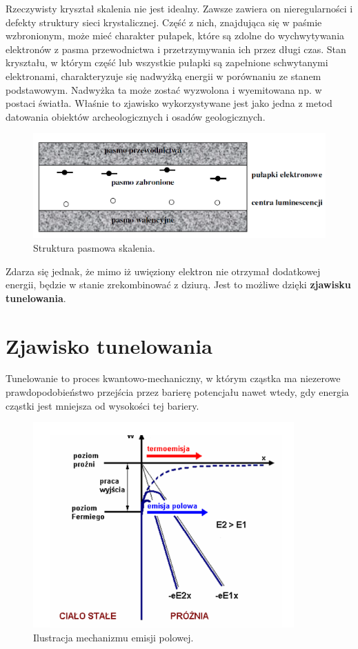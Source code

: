 Rzeczywisty kryształ skalenia nie jest idealny. Zawsze zawiera on nieregularności i defekty struktury sieci krystalicznej. Część z nich, znajdująca się w paśmie wzbronionym, może mieć charakter pułapek, które są zdolne do wychwytywania
elektronów z pasma przewodnictwa i przetrzymywania ich przez długi czas. Stan kryształu, w którym część lub wszystkie pułapki są zapełnione schwytanymi elektronami,
charakteryzuje się nadwyżką energii w porównaniu ze stanem podstawowym.  Nadwyżka ta może zostać wyzwolona i wyemitowana np. w postaci światła. Właśnie to zjawisko wykorzystywane jest jako jedna z metod datowania obiektów archeologicznych
i osadów geologicznych. 
\begin{figure}[h]
\centering
\includegraphics[width=15cm]{strukturapasmowa}
\caption{Struktura pasmowa skalenia. \cite{struktura_pasmowa}}
\label{fig:Struktura pasmowa}
\end{figure}

Zdarza się jednak, że mimo iż uwięziony elektron nie otrzymał dodatkowej energii, będzie w stanie zrekombinować z dziurą. Jest to  możliwe dzięki  \textbf{zjawisku tunelowania}.

\section{Zjawisko tunelowania}
Tunelowanie to  proces kwantowo-mechaniczny, w którym cząstka ma niezerowe prawdopodobieństwo przejścia przez barierę potencjału nawet wtedy, gdy energia cząstki jest mniejsza od wysokości tej bariery.


\begin{figure}[H]
\centering
\includegraphics[width=10cm]{tunelowanie}
\caption{Ilustracja mechanizmu emisji polowej. \cite{tunel_pic}}
\label{fig:Tunelowanie}
\end{figure}



